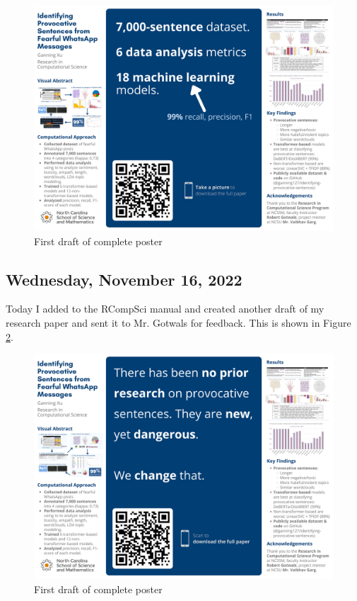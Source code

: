 \documentclass[11pt,letterpaper]{article}
\begin{document}
\begin{figure}[!hbt]
    \centering
    \includegraphics[scale=0.1]{images/draft1_poster.png}
    \caption{First draft of complete poster}
    \label{fig:draft1_poster}
\end{figure}

\subsection{Wednesday, November 16, 2022}
Today I added to the RCompSci manual and created another draft of my research paper and sent it to Mr. Gotwals for feedback. This is shown in Figure \ref{fig:draft2_poster}. 


\begin{figure}[!hbt]
    \centering
    \includegraphics[scale=0.1]{images/draft2_poster.png}
    \caption{First draft of complete poster}
    \label{fig:draft2_poster}
\end{figure}
\end{document}
